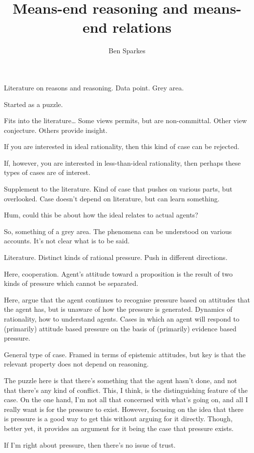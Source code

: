 \documentclass[10pt]{article}
\title{Means-end reasoning and means-end relations}
\author{Ben Sparkes}
\begin{document}
Literature on reasons and reasoning.
Data point.
Grey area.

Started as a puzzle.

Fits into the literature\dots
Some views permits, but are non-committal.
Other view conjecture.
Others provide insight.

If you are interested in ideal rationality, then this kind of case can be rejected.

If, however, you are interested in less-than-ideal rationality, then perhaps these types of cases are of interest.




Supplement to the literature.
Kind of case that pushes on various parts, but overlooked.
Case doesn't depend on literature, but can learn something.

Hum, could this be about how the ideal relates to actual agents?

So, something of a grey area.
The phenomena can be understood on various accounts.
It's not clear what is to be said.

Literature.
Distinct kinds of rational pressure.
Push in different directions.

Here, cooperation.
Agent's attitude toward a proposition is the result of two kinds of pressure which cannot be separated.

Here, argue that the agent continues to recognise pressure based on attitudes that the agent has, but is unaware of how the pressure is generated.
Dynamics of rationality, how to understand agents.
Cases in which an agent will respond to (primarily) attitude based pressure on the basis of (primarily) evidence based pressure.

General type of case.
Framed in terms of epistemic attitudes, but key is that the relevant property does not depend on reasoning.




The puzzle here is that there's something that the agent hasn't done, and not that there's any kind of conflict.
This, I think, is the distinguishing feature of the case.
On the one hand, I'm not all that concerned with what's going on, and all I really want is for the pressure to exist.
However, focusing on the idea that there is pressure is a good way to get this without arguing for it directly.
Though, better yet, it provides an argument for it being the case that pressure exists.

If I'm right about pressure, then there's no issue of trust.
\end{document}
